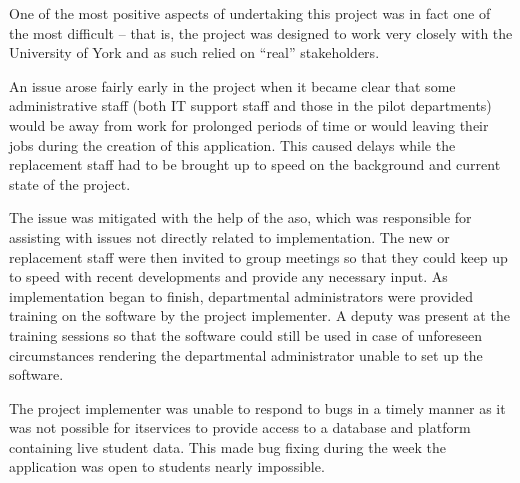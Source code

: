 \documentclass[draft]{scrartcl}
\begin{document}


One of the most positive aspects of undertaking this project was in fact one
of the most difficult -- that is, the project was designed to work very
closely with the University of York and as such relied on ``real''
stakeholders.

An issue arose fairly early in the project when it became clear that some
administrative staff (both IT support staff and those in the pilot
departments) would be away from work for prolonged periods of time or would
leaving their jobs during the creation of this application. This caused delays
while the replacement staff had to be brought up to speed on the background
and current state of the project.

The issue was mitigated with the help of the \gls{aso}, which was responsible
for assisting with issues not directly related to implementation. The new or
replacement staff were then invited to group meetings so that they could keep
up to speed with recent developments and provide any necessary input. As
implementation began to finish, departmental administrators were provided
training on the software by the project implementer. A deputy was present at
the training sessions so that the software could still be used in case of
unforeseen circumstances rendering the departmental administrator unable to
set up the software.





The project implementer was unable to respond to bugs in a timely manner as
it was not possible for \gls{itservices} to provide access to a database and
platform containing live student data. This made bug fixing during the week
the application was open to students nearly impossible.
\end{document}
